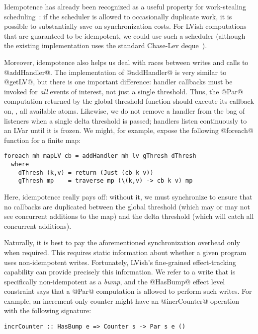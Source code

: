 Idempotence has already been recognized as a useful property for
work-stealing scheduling~\cite{idempotent}: if the scheduler is
allowed to occasionally duplicate work, it is possible to
substantially save on synchronization costs.  For LVish computations
that are guaranteed to be idempotent, we could use such a scheduler
(although the existing implementation uses the standard Chase-Lev
deque~\cite{ChaseLev}).

Moreover, idempotence also helps us deal with races between writes and
calls to @addHandler@.  The implementation of @addHandler@ is very
similar to @getLV@, but there is one important difference: handler
callbacks must be invoked for \emph{all} events of interest, not just
a single threshold.  Thus, the @Par@ computation returned by the
global threshold function should execute its callback on, \eg, all
available atoms.  Likewise, we do not remove a handler from the bag of
listeners when a single delta threshold is passed; handlers listen
continuously to an LVar until it is frozen.  We might, for example,
expose the following @foreach@ function for a finite map:

\singlespacing
\begin{lstlisting}
foreach mh mapLV cb = addHandler mh lv gThresh dThresh
  where
    dThresh (k,v) = return (Just (cb k v))
    gThresh mp    = traverse mp (\(k,v) -> cb k v) mp
\end{lstlisting}
\doublespacing

{Here, idempotence really pays off: without it, we must synchronize to
ensure that no callbacks are duplicated between the global threshold
(which may or may not see concurrent additions to the map) and the
delta threshold (which will catch all concurrent additions).}

Naturally, it is best to pay the aforementioned synchronization
overhead only when required.  This requires static information about
whether a given program uses non-idempotent writes.  Fortunately,
LVish's fine-grained effect-tracking capability can provide precisely
this information.  We refer to a write that is specifically
non-idempotent as a \emph{bump}, and the @HasBump@ effect level
constraint says that a @Par@ computation is allowed to perform such
writes.  For example, an increment-only counter might have an
@incrCounter@ operation with the following signature:



\singlespacing
\begin{lstlisting}
incrCounter :: HasBump e => Counter s -> Par s e ()
\end{lstlisting}
\doublespacing

\fi

